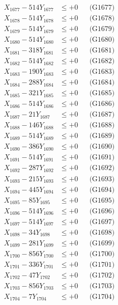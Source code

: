 \documentclass[a4paper,10pt]{article}
\begin{document}
{\begin{align}
X_{1677} - 514Y_{1677} &\leq +0 && \text{(G1677)} \\
X_{1678} - 514Y_{1678} &\leq +0 && \text{(G1678)} \\
X_{1679} - 514Y_{1679} &\leq +0 && \text{(G1679)} \\
X_{1680} - 514Y_{1680} &\leq +0 && \text{(G1680)} \\
\allowbreak
X_{1681} - 318Y_{1681} &\leq +0 && \text{(G1681)} \\
X_{1682} - 514Y_{1682} &\leq +0 && \text{(G1682)} \\
X_{1683} - 190Y_{1683} &\leq +0 && \text{(G1683)} \\
X_{1684} - 288Y_{1684} &\leq +0 && \text{(G1684)} \\
X_{1685} - 321Y_{1685} &\leq +0 && \text{(G1685)} \\
X_{1686} - 514Y_{1686} &\leq +0 && \text{(G1686)} \\
X_{1687} - 21Y_{1687} &\leq +0 && \text{(G1687)} \\
X_{1688} - 146Y_{1688} &\leq +0 && \text{(G1688)} \\
X_{1689} - 514Y_{1689} &\leq +0 && \text{(G1689)} \\
X_{1690} - 386Y_{1690} &\leq +0 && \text{(G1690)} \\
\allowbreak
X_{1691} - 514Y_{1691} &\leq +0 && \text{(G1691)} \\
X_{1692} - 287Y_{1692} &\leq +0 && \text{(G1692)} \\
X_{1693} - 215Y_{1693} &\leq +0 && \text{(G1693)} \\
X_{1694} - 445Y_{1694} &\leq +0 && \text{(G1694)} \\
X_{1695} - 85Y_{1695} &\leq +0 && \text{(G1695)} \\
X_{1696} - 514Y_{1696} &\leq +0 && \text{(G1696)} \\
X_{1697} - 514Y_{1697} &\leq +0 && \text{(G1697)} \\
X_{1698} - 34Y_{1698} &\leq +0 && \text{(G1698)} \\
X_{1699} - 281Y_{1699} &\leq +0 && \text{(G1699)} \\
X_{1700} - 856Y_{1700} &\leq +0 && \text{(G1700)} \\
\allowbreak
X_{1701} - 336Y_{1701} &\leq +0 && \text{(G1701)} \\
X_{1702} - 47Y_{1702} &\leq +0 && \text{(G1702)} \\
X_{1703} - 856Y_{1703} &\leq +0 && \text{(G1703)} \\
X_{1704} - 7Y_{1704} &\leq +0 && \text{(G1704)} \\

\end{align}}
\end{document}
